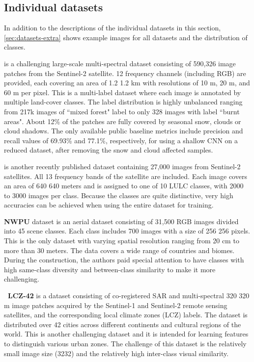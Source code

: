  

\subsection{Individual datasets}
In addition to the descriptions of the individual datasets in this section, \cref{sec:datasets-extra} shows example images for all datasets and the distribution of classes.



{\bf \ben{}} \citep{sumbul2019:bigearthnet} is a challenging large-scale multi-spectral dataset consisting of 590,326 image patches from the Sentinel-2 satellite. 12 frequency channels (including RGB) are provided, each covering an area of 1.2  1.2 km with resolutions of 10 m, 20 m, and 60 m per pixel. This is a multi-label dataset where each image is annotated by multiple land-cover classes. The label distribution is highly unbalanced ranging from 217k images of ``mixed forest" label to only 328 images with label ``burnt areas". About 12\% of the patches are fully covered by seasonal snow, clouds or cloud shadows. The only available public baseline metrics include precision and recall values of 69.93\% and 77.1\%, respectively, for using a shallow CNN on a reduced dataset, after removing the snow and cloud affected samples.



{\bf \eur{}} \citep{helber2019:eurosat} is another recently published dataset containing 27,000 images from Sentinel-2 satellites. All 13 frequency bands of the satellite are included. Each image covers an area of 640  640 meters and is assigned to one of 10 LULC classes, with 2000 to 3000 images per class. Because the classes are quite distinctive, very high accuracies can be achieved when using the entire dataset for training.



{\bf NWPU \res{}} \citep{cheng2017:resisc45} dataset is an aerial dataset consisting of 31,500 RGB images divided into 45 scene classes. Each class includes 700 images with a size of 256  256 pixels. This is the only dataset with varying spatial resolution ranging from 20 cm to more than 30 meters. The data covers a wide range of countries and biomes. During the construction, the authors paid special attention to have classes with high same-class diversity and between-class similarity to make it more challenging.



{\bf \sos\ LCZ-42} \citep{zhu2018:so2sat} is a dataset consisting of co-registered SAR and multi-spectral 320  320 m image patches acquired by the Sentinel-1 and Sentinel-2 remote sensing satellites, and the corresponding local climate zones (LCZ) \citep{stewart12:lcz} labels. The dataset is distributed over 42 cities across different continents and cultural regions of the world. This is another challenging dataset and it is intended for learning features to distinguish various urban zones. The challenge of this dataset is the relatively small image size (3232) and the relatively high inter-class visual similarity.



